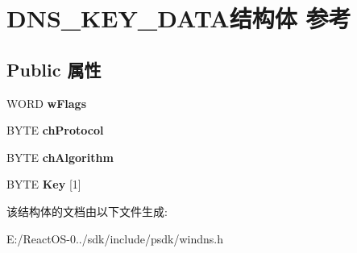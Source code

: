 \hypertarget{struct_d_n_s___k_e_y___d_a_t_a}{}\section{D\+N\+S\+\_\+\+K\+E\+Y\+\_\+\+D\+A\+T\+A结构体 参考}
\label{struct_d_n_s___k_e_y___d_a_t_a}
\subsection*{Public 属性}
\begin{DoxyCompactItemize}
\item 
\mbox{\label{struct_d_n_s___k_e_y___d_a_t_a_af4da9aaccd88631d8c21ec08f05e2284}} 
W\+O\+RD {\bfseries w\+Flags}
\item 
\mbox{\label{struct_d_n_s___k_e_y___d_a_t_a_a16a813cfda72d8533ee46334e4751c68}} 
B\+Y\+TE {\bfseries ch\+Protocol}
\item 
\mbox{\label{struct_d_n_s___k_e_y___d_a_t_a_a2c7cc45acff0d709bae91d084f566fab}} 
B\+Y\+TE {\bfseries ch\+Algorithm}
\item 
\mbox{\label{struct_d_n_s___k_e_y___d_a_t_a_a4edc0fe8031639c7bea86f63a30bd25a}} 
B\+Y\+TE {\bfseries Key} \mbox{[}1\mbox{]}
\end{DoxyCompactItemize}


该结构体的文档由以下文件生成\+:\begin{DoxyCompactItemize}
\item 
E\+:/\+React\+O\+S-\/0../sdk/include/psdk/windns.\+h\end{DoxyCompactItemize}

